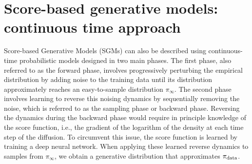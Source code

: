 \documentclass[english,graybox,envcountchap,envcountsame,sectrefs,shortlabels]{svmono}
\theoremstyle{style}
\begin{document}
\section{Score-based generative models: continuous time approach}

Score-based Generative Models (SGMs) can also be described using continuous-time probabilistic models designed in two main phases. The first phase, also referred to as the forward phase, involves progressively perturbing the empirical distribution by adding noise to the training data until its distribution approximately reaches an {easy-to-sample} distribution $\pi_{\infty}$. The second phase involves learning to reverse this noising dynamics by sequentially removing the noise, which is referred to as the sampling phase or backward phase. 
Reversing the dynamics during the backward phase would require in principle knowledge of the score function, i.e., the gradient of the logarithm of the density at each time step of the diffusion. 
To circumvent this issue, the score function is learned by training  a deep neural network. When applying these learned reverse dynamics to samples from  $\pi_\infty$, we obtain a generative distribution that approximates  $\pi_{\rm data}$. 


\newcommand{\sched}{\beta}
\newcommand{\ola}{\overleftarrow}
\newcommand{\ora}{\overrightarrow}
\newcommand{\gausspdf}{\varphi}
\newcommand{\param}{\theta}
\newcommand{\pihat}{\widehat{\pi}_N^{(\beta,\theta)}}
\end{document}

